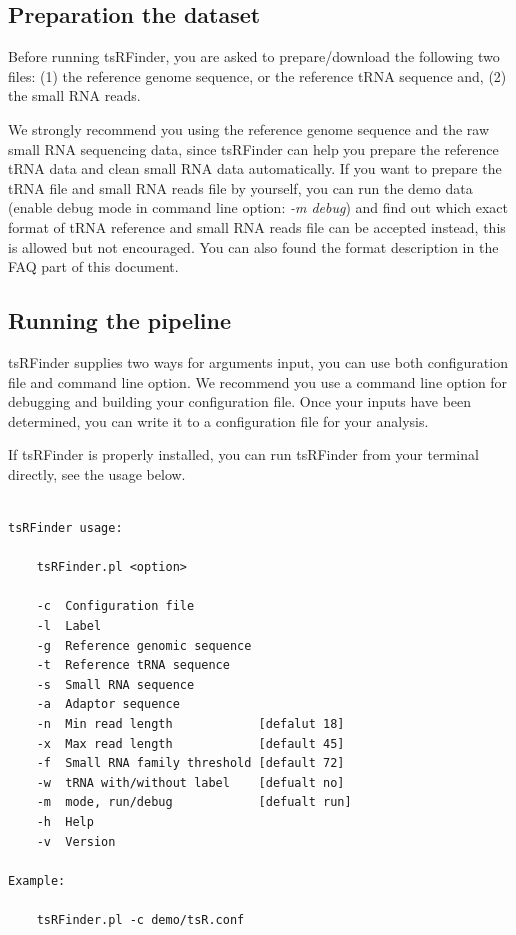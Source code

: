 \documentclass[11pt, a4paper]{article}
\begin{document}
\subsection{Preparation the dataset}

Before running tsRFinder, you are asked to prepare/download the following two files: (1) the reference genome sequence, or the reference tRNA sequence and, (2) the small RNA reads.

We strongly recommend you using the reference genome sequence and the raw small RNA sequencing data, since tsRFinder can help you prepare the reference tRNA data and clean small RNA data automatically. If you want to prepare the tRNA file and small RNA reads file by yourself, you can run the demo data (enable debug mode in command line option: \emph{-m debug}) and find out which exact format of tRNA reference and small RNA reads file can be accepted instead, this is allowed but not encouraged. You can also found the format description in the FAQ part of this document.

\subsection{Running the pipeline}

tsRFinder supplies two ways for arguments input, you can use both configuration file and command line option. We recommend you use a command line option for debugging and building your configuration file. Once your inputs have been determined, you can write it to a configuration file for your analysis.

If tsRFinder is properly installed, you can run tsRFinder from your terminal directly, see the usage below.

{\footnotesize \begin{tcolorbox}[colback=blue!5!white,colframe=blue!75!black,title=Usage of tsRFinder: ./tsRFinder.pl -h]
\begin{verbatim}

tsRFinder usage:

    tsRFinder.pl <option>

    -c  Configuration file
    -l  Label
    -g  Reference genomic sequence
    -t  Reference tRNA sequence
    -s  Small RNA sequence
    -a  Adaptor sequence
    -n  Min read length            [defalut 18]
    -x  Max read length            [default 45]
    -f  Small RNA family threshold [default 72]
    -w  tRNA with/without label    [defualt no]
    -m  mode, run/debug            [defualt run]
    -h  Help
    -v  Version

Example:

    tsRFinder.pl -c demo/tsR.conf

\end{verbatim}
\end{tcolorbox}}
\end{document}
